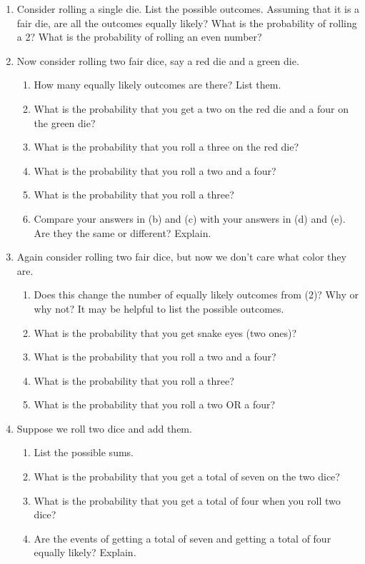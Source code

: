 \begin{enumerate}

\item Consider rolling a single die. List the possible outcomes. Assuming that it is a fair die, are all the outcomes equally likely? What is the probability of rolling a 2? What is the probability of rolling an even number? 
\vspace{.1in}




\item Now consider rolling two fair dice, say a red die and a green die.
\begin{enumerate}
\item  How many equally likely outcomes are there? List them. 
\item What is the probability that you get a two on the red die and a four on the green die? 
\item What is the probability that you roll a three on the red die? 
\item What is the probability that you roll a two and a four? 
\item What is the probability  that you roll a three? 
\item Compare your answers in (b) and (c) with your answers in (d) and (e). Are they the same or different? Explain.
\end{enumerate}

\vspace{.1in}

\item Again consider rolling two fair dice, but now we don't care what color they are. 
\begin{enumerate}
\item Does this change the number of equally likely outcomes from (2)? Why or why not? It may be helpful to list the possible outcomes.
\item What is the probability that you get snake eyes (two ones)?
\item What is the probability that you roll a two and a four? 
\item What is the probability  that you roll a three? 
\item What is the probability that you roll a two OR a four?
\end{enumerate}

\vspace{.1in}
\item Suppose we roll two dice and add them.
\begin{enumerate} 
\item List the possible sums.
\item What is the probability that you get a total of seven on the two dice?
\item  What is the probability that you get a total of four when you roll two dice?
\item Are the events of getting a total of seven and getting a total of four equally likely? Explain.

\end{enumerate}

\end{enumerate} 

